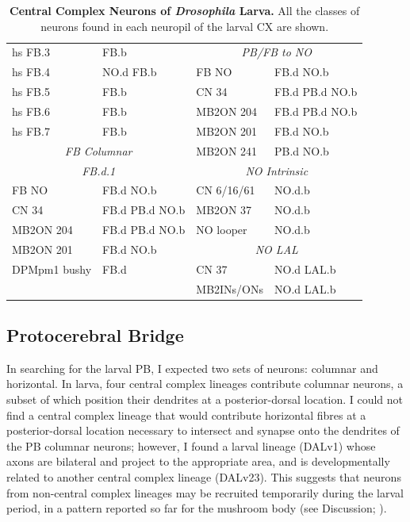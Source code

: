 \begin{table}[H]
{\begin{tabular}{l|l|l|l}
        hs FB.3 & FB.b & \multicolumn{2}{c}{\textit{PB/FB to NO}} \\
        hs FB.4 & NO.d FB.b & FB NO & FB.d NO.b \\
        hs FB.5 & FB.b & CN 34 & FB.d PB.d NO.b \\
        hs FB.6 & FB.b & MB2ON 204 & FB.d PB.d NO.b \\
        hs FB.7 & FB.b & MB2ON 201 & FB.d NO.b \\
        \multicolumn{2}{c|}{\textit{FB Columnar}} & MB2ON 241 & PB.d NO.b \\
        \multicolumn{2}{c|}{\textit{FB.d.1}} & \multicolumn{2}{c}{\textit{NO Intrinsic}} \\
        FB NO & FB.d NO.b & CN 6/16/61 & NO.d.b \\
        CN 34 & FB.d PB.d NO.b & MB2ON 37 & NO.d.b \\
        MB2ON 204 & FB.d PB.d NO.b & NO looper & NO.d.b \\
        MB2ON 201 & FB.d NO.b & \multicolumn{2}{c}{\textit{NO LAL}} \\
        DPMpm1 bushy & FB.d & CN 37 & NO.d LAL.b \\
        &  & MB2INs/ONs & NO.d LAL.b \\
        \bottomrule
    \end{tabular}
    }
    \caption[The Neurons of \textit{Drosophila Larva Central Complex}] { \textbf{Central Complex Neurons of \textit{Drosophila} Larva.} All the classes of neurons found in each neuropil of the larval CX are shown.}
    \label{tab:neuropil_connectivity}
\end{table}

    \subsection{Protocerebral Bridge}
    \label{PB}
        In searching for the larval PB, I expected two sets of neurons: columnar and horizontal. In larva, four central complex lineages contribute columnar neurons, a subset of which position their dendrites at a posterior-dorsal location. I could not find a central complex lineage that would contribute horizontal fibres at a posterior-dorsal location necessary to intersect and synapse onto the dendrites of the PB columnar neurons; however, I found a larval lineage (DALv1) whose axons are bilateral and project to the appropriate area, and is developmentally related to another central complex lineage (DALv23). This suggests that neurons from non-central complex lineages may be recruited temporarily during the larval period, in a pattern reported so far for the mushroom body (see Discussion; \citep{truman2023metamorphosis}). 

